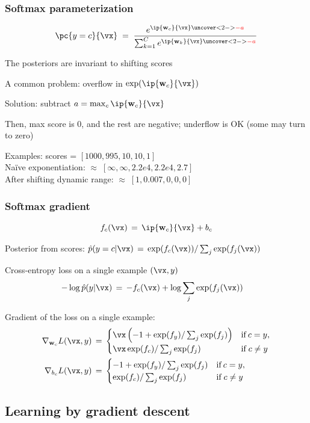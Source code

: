 \documentclass[xcolor=dvipsnames]{beamer}
\begin{document}
\begin{frame}
  \frametitle{Softmax parameterization}
\[
 \pc{y=c}{\vx}\;=\;
 \frac{e^{\ip{\mathbf{w}_c}{\vx}\uncover<2->{\textcolor{red}{-a}}}}
 {\sum_{k=1}^Ce^{\ip{\mathbf{w}_k}{\vx}\uncover<2->{\textcolor{red}{-a}}}}
 \]
  \bi
\item The posteriors are invariant to shifting scores
\item A common problem: overflow in
  $\exp(\ip{\mathbf{w}_c}{\vx})$
\item Solution: subtract $a=\max_c
  \ip{\mathbf{w}_c}{\vx}$
\item Then, max score is 0, and the rest are negative; underflow
  is OK (some may turn to zero)
\item Examples: scores = $[1000, 995, 10, 10, 1]$\\
Na\"ive exponentiation: $\approx\;[\infty, \infty, 2.2e4, 2.2e4,
2.7]$\\
After shifting dynamic range: $\approx\;[1, 0.007, 0, 0, 0]$
\ei
\end{frame}

\begin{frame}
  \frametitle{Softmax gradient}
\[f_c(\vx)\,=\,\ip{\mathbf{w}_c}{\vx}+b_c\]
  \bi
\item Posterior from scores: $\hat{p}(y=c|\vx)\,=\,\exp(f_c(\vx))/\sum_j\exp(f_j(\vx))$
\item Cross-entropy loss on a single example $(\vx,y)$
 \begin{align*}
-\log \hat{p}(y|\vx)\,&=\,-f_c(\vx)+\log\sum_j\exp(f_j(\vx))
\end{align*}
\item Gradient of the loss on a single example:
\begin{align*}
\nabla_{\mathbf{w}_c}L(\vx,y)\,&=\,
  \begin{cases}
    \vx\left(-1+\exp(f_y)/\sum_j\exp(f_j)\right)
    & \text{if}\:c=y,\\
    \vx\exp(f_c)/\sum_j\exp(f_j)
    & \text{if}\;c\ne y
  \end{cases}\\
\nabla_{b_c}L(\vx,y)\,&=\,\begin{cases}
    -1+\exp(f_y)/\sum_j\exp(f_j)
    & \text{if}\:c=y,\\
    \exp(f_c)/\sum_j\exp(f_j)
    & \text{if}\;c\ne y
  \end{cases}
\end{align*}
\ei
\end{frame}


\subsection{Learning by gradient descent}
\end{document}
